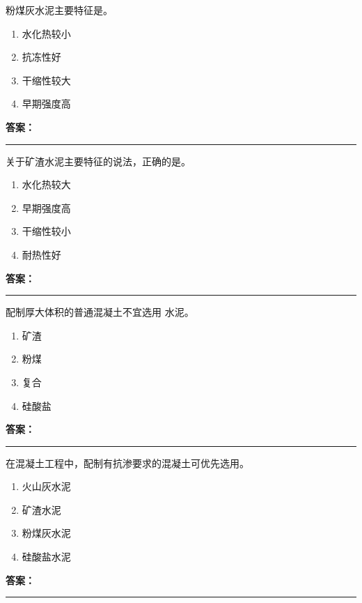 \documentclass[UTF8,fontset=fandol,11pt]{ctexart}
\newcommand{\answerline}{\textcolor{answerred}{\rule{2.4cm}{0.7pt}}}
\begin{document}
\vspace{0.2em}

\begin{quizbox}[title={第 47 题}]
粉煤灰水泥主要特征是。\\
\begin{enumerate}[label=\Alph*.]
\item 水化热较小
\item 抗冻性好
\item 干缩性较大
\item 早期强度高
\end{enumerate}
\textbf{\textcolor{answerred}{答案：}} \answerline
\end{quizbox}

\vspace{0.2em}

\begin{quizbox}[title={第 48 题}]
关于矿渣水泥主要特征的说法，正确的是。\\
\begin{enumerate}[label=\Alph*.]
\item 水化热较大
\item 早期强度高
\item 干缩性较小
\item 耐热性好
\end{enumerate}
\textbf{\textcolor{answerred}{答案：}} \answerline
\end{quizbox}

\vspace{0.2em}

\begin{quizbox}[title={第 49 题}]
配制厚大体积的普通混凝土不宜选用 水泥。\\
\begin{enumerate}[label=\Alph*.]
\item 矿渣
\item 粉煤
\item 复合
\item 硅酸盐
\end{enumerate}
\textbf{\textcolor{answerred}{答案：}} \answerline
\end{quizbox}

\vspace{0.2em}

\begin{quizbox}[title={第 50 题}]
在混凝土工程中，配制有抗渗要求的混凝土可优先选用。\\
\begin{enumerate}[label=\Alph*.]
\item 火山灰水泥
\item 矿渣水泥
\item 粉煤灰水泥
\item 硅酸盐水泥
\end{enumerate}
\textbf{\textcolor{answerred}{答案：}} \answerline
\end{quizbox}
\end{document}
